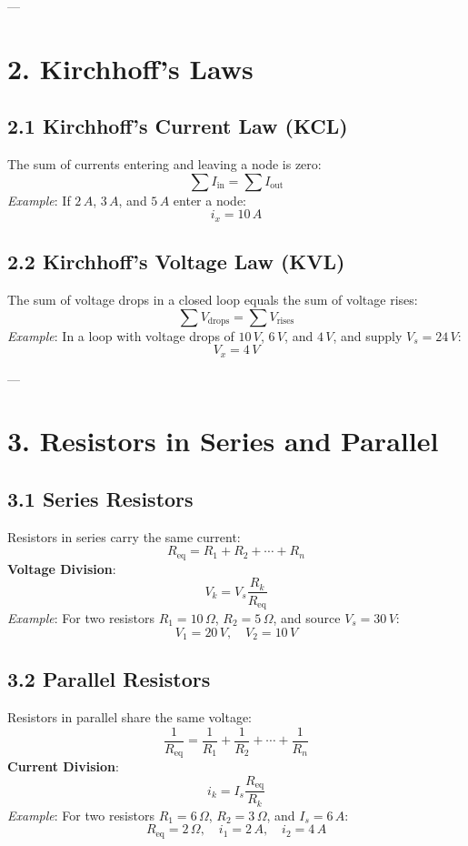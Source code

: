 \documentclass[10pt]{article}
\begin{document}
\begin{multicols}{2}
---

\section*{2. Kirchhoff’s Laws}

\subsection*{2.1 Kirchhoff's Current Law (KCL)}
The sum of currents entering and leaving a node is zero:
\[
\sum I_{\text{in}} = \sum I_{\text{out}}
\]
\textit{Example}: If \( 2\,A \), \( 3\,A \), and \( 5\,A \) enter a node:
\[
i_x = 10\,A
\]

\subsection*{2.2 Kirchhoff's Voltage Law (KVL)}
The sum of voltage drops in a closed loop equals the sum of voltage rises:
\[
\sum V_{\text{drops}} = \sum V_{\text{rises}}
\]
\textit{Example}: In a loop with voltage drops of \(10\,V\), \(6\,V\), and \(4\,V\), and supply \(V_s = 24\,V\):
\[
V_x = 4\,V
\]

---

\section*{3. Resistors in Series and Parallel}

\subsection*{3.1 Series Resistors}
Resistors in series carry the same current:
\[
R_{\text{eq}} = R_1 + R_2 + \cdots + R_n
\]
\textbf{Voltage Division}:
\[
V_k = V_s \frac{R_k}{R_{\text{eq}}}
\]
\textit{Example}: For two resistors \(R_1 = 10\,\Omega\), \(R_2 = 5\,\Omega\), and source \(V_s = 30\,V\):
\[
V_1 = 20\,V, \quad V_2 = 10\,V
\]

\subsection*{3.2 Parallel Resistors}
Resistors in parallel share the same voltage:
\[
\frac{1}{R_{\text{eq}}} = \frac{1}{R_1} + \frac{1}{R_2} + \cdots + \frac{1}{R_n}
\]
\textbf{Current Division}:
\[
i_k = I_s \frac{R_{\text{eq}}}{R_k}
\]
\textit{Example}: For two resistors \(R_1 = 6\,\Omega\), \(R_2 = 3\,\Omega\), and \(I_s = 6\,A\):
\[
R_{\text{eq}} = 2\,\Omega, \quad i_1 = 2\,A, \quad i_2 = 4\,A
\]


\end{multicols}
\end{document}
